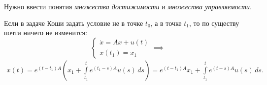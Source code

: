 Нужно ввести понятия \textit{множества достижимости} и \textit{множества управляемости}.

\begin{rmrk}
    Если в задаче Коши задать условие не в точке $t_0$, а в точке $t_1$, то по существу почти ничего не изменится:
    \begin{equation*}
        \begin{cases}
            \dot{x} = Ax + u(t) \\
            x(t_1) = x_1
        \end{cases} \implies
    \end{equation*}
    \begin{multline*}
        x(t) = e^{(t - t_1)A} \left( x_1 + \int\limits_{t_1}^{t} e^{(t_1 - s)A} u(s)\, ds \right) = 
        e^{(t - t_1)A}x_1 + \int\limits_{t_1}^{t} e^{(t - s)A} u(s)\, ds.
    \end{multline*}
\end{rmrk}